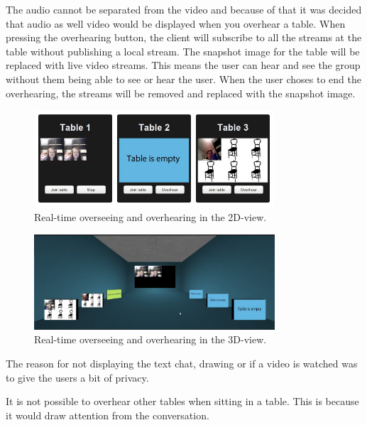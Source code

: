 \documentclass[12pt, titlepage]{article}
\begin{document}
The audio cannot be separated from the video and because of that it was decided that audio as well video would be displayed when you overhear a table. When pressing the overhearing button, the client will subscribe to all the streams at the table without publishing a local stream. The snapshot image for the table will be replaced with live video streams. This means the user can hear and see the group without them being able to see or hear the user. When the user choses to end the overhearing, the streams will be removed and replaced with the snapshot image.
\begin{figure}[H]
  \centering
	\includegraphics[width=0.8\textwidth,keepaspectratio]{overhear2d.jpg}
  \caption{Real-time overseeing and overhearing in the 2D-view.}
\end{figure}
\begin{figure}[H]
  \centering
	\includegraphics[width=0.8\textwidth,keepaspectratio]{3doverhearing.jpg}
  \caption{Real-time overseeing and overhearing in the 3D-view.}
\end{figure}
The reason for not displaying the text chat, drawing or if a video is watched was to give the users a bit of privacy. 

It is not possible to overhear other tables when sitting in a table. This is because it would draw attention from the conversation.
\end{document}

